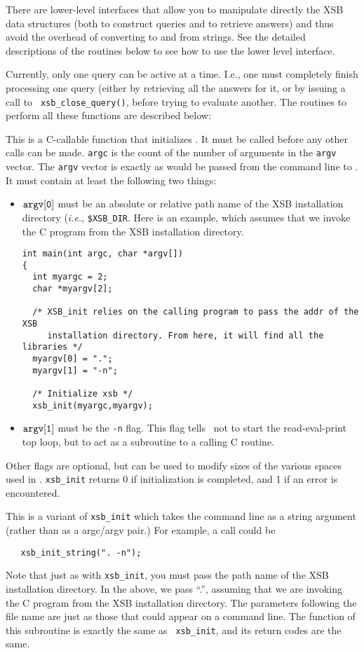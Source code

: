 There are lower-level interfaces that allow you to manipulate directly
the XSB data structures (both to construct queries and to retrieve
answers) and thus avoid the overhead of converting to and from
strings.  See the detailed descriptions of the routines below to see
how to use the lower level interface.

Currently, only one query can be active at a time.
I.e., one must completely finish processing one query (either by
retrieving all the answers for it, or by issuing a call to {\tt
xsb\_close\_query()}, before trying to evaluate another.  The
routines to perform all these functions are described below:

\begin{description}
 
This is a C-callable function that initializes \ourprolog . It must be
called before any other calls can be made.  {\tt argc} is the count of
the number of arguments in the {\tt argv} vector.  The {\tt argv}
vector is exactly as would be passed from the command line to
\ourprolog .  It must contain at least the following two things:
\begin{itemize}
\item $\tt argv[0]$ must be an absolute or relative path name of the XSB
  installation directory ({\it i.e.}, {\tt \$XSB\_DIR}.  Here is an
  example, which assumes that we invoke the C program from the XSB
  installation directory.
    \begin{verbatim}
int main(int argc, char *argv[])
{ 
  int myargc = 2;
  char *myargv[2];

  /* XSB_init relies on the calling program to pass the addr of the XSB
     installation directory. From here, it will find all the libraries */
  myargv[0] = ".";
  myargv[1] = "-n";

  /* Initialize xsb */
  xsb_init(myargc,myargv);
    \end{verbatim}
  \item $\tt argv[1]$ must be the {\tt -n} flag.  This flag tells
    \ourprolog\ not to start the read-eval-print top loop, but to act as a
    subroutine to a calling C routine.
\end{itemize}
Other flags are optional, but can be used to modify sizes of the various
spaces used in \ourprolog.  {\tt xsb\_init} returns 0 if initialization is
completed, and 1 if an error is encountered.

 
This is a variant of {\tt xsb\_init} which takes the command line as a
string argument (rather than as a argc/argv pair.)  For example, a call
could be
\begin{verbatim}
   xsb_init_string(". -n");
\end{verbatim}
Note that just as with {\tt xsb\_init}, you must pass the path name of the
XSB installation directory. In the above, we pass ``.'', assuming that we
are invoking the C program from the XSB installation directory.  The
parameters following the file name are just as those that could appear on a
command line.  The function of this subroutine is exactly the same as {\tt
  xsb\_init}, and its return codes are the same.


\end{description}
